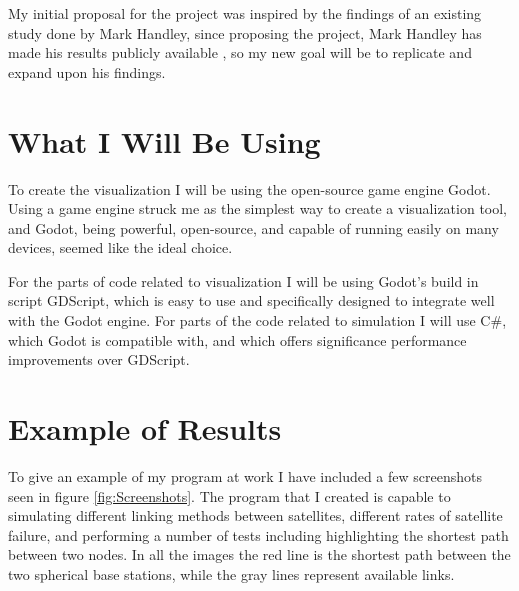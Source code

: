 \documentclass[12pt,a4paper,twoside,openright]{report}
\begin{document}
My initial proposal for the project was inspired by the findings of an existing study done by Mark Handley, since proposing the project, Mark Handley has made his results publicly available \cite{OriginalReport}, so my new goal will be to replicate and expand upon his findings.

\section{What I Will Be Using}
To create the visualization I will be using the open-source game engine Godot. Using a game engine struck me as the simplest way to create a visualization tool, and Godot, being powerful, open-source, and capable of running easily on many devices, seemed like the ideal choice.

For the parts of code related to visualization I will be using Godot's build in script GDScript, which is easy to use and specifically designed to integrate well with the Godot engine. For parts of the code related to simulation I will use C\#, which Godot is compatible with, and which offers significance performance improvements over GDScript.

\section{Example of Results}
To give an example of my program at work I have included a few screenshots seen in figure \ref{fig:Screenshots}. The program that I created is capable to simulating different linking methods between satellites, different rates of satellite failure, and performing a number of tests including highlighting the shortest path between two nodes. In all the images the red line is the shortest path between the two spherical base stations, while the gray lines represent available links.
\end{document}
